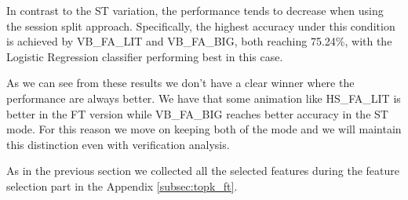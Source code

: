 \documentclass{article}
\begin{document}
In contrast to the ST variation, the performance tends to decrease when using the session split approach.
Specifically, the highest accuracy under this condition is achieved by VB\_FA\_LIT and VB\_FA\_BIG, both reaching 75.24\%, with the Logistic Regression classifier performing best in this case.

As we can see from these results we don't have a clear winner where the performance are always better.
We have that some animation like HS\_FA\_LIT is better in the FT version while VB\_FA\_BIG reaches better accuracy in the ST mode.
For this reason we move on keeping both of the mode and we will maintain this distinction even with verification analysis.

As in the previous section we collected all the selected features during the feature selection part in the Appendix \ref{subsec:topk_ft}.
\end{document}
